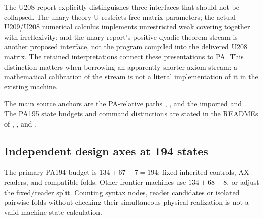 The U208 report explicitly distinguishes three interfaces that should not be
collapsed. The unary theory U restricts free matrix parameters; the actual
U209/U208 numerical calculus implements unrestricted weak covering together
with irreflexivity; and the unary report's positive dyadic theorem stream is
another proposed interface, not the program compiled into the delivered U208
matrix. The retained interpretations connect these presentations to PA.
This distinction matters when borrowing an apparently shorter axiom stream:
a mathematical calibration of the stream is not a literal implementation of
it in the existing machine.

The main source anchors are the PA-relative paths
,
, and the imported
 and .
The PA195 state budgets and command distinctions are stated in the READMEs of
,
, and
.

\subsection{Independent design axes at 194 states}

The primary PA194 budget is $134+67-7=194$: fixed inherited controls, AX readers,
and compatible folds. Other frontier machines use $134+68-8$, or adjust the
fixed/reader split. Counting syntax nodes, reader candidates or isolated
pairwise folds without checking their simultaneous physical realization is
not a valid machine-state calculation.


